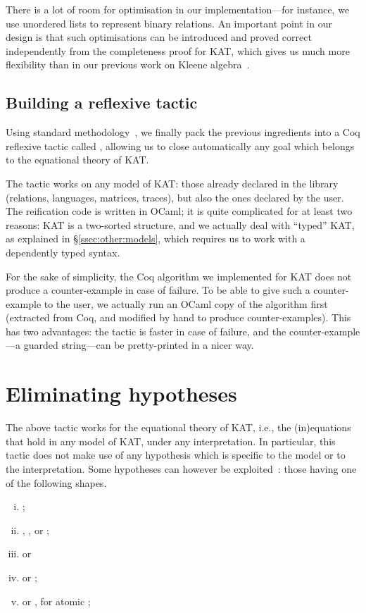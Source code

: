 \documentclass[a4paper]{llncs}
\begin{document}
There is a lot of room for optimisation in our implementation---for
instance, we use unordered lists to represent binary relations. An
important point in our design is that such optimisations can be
introduced and proved correct independently from the completeness
proof for KAT, which gives us much more flexibility than in our
previous work on Kleene algebra~\cite{bp:itp10:kacoq}.

\subsection{Building a reflexive tactic}
\label{ssec:kat:tac}

Using standard
methodology~\cite{BoyerMoore81,AllenCHA90,GregoireM05}, we finally pack the previous ingredients into a Coq reflexive tactic
called , allowing us to close automatically any goal which
belongs to the equational theory of KAT.

The tactic works on any model of KAT: those already declared in the
library (relations, languages, matrices, traces), but also the ones
declared by the user. 
The reification code is written in OCaml; it is quite complicated for
at least two reasons: KAT is a two-sorted structure, and we actually
deal with ``typed'' KAT, as explained in §\ref{ssec:other:models},
which requires us to work with a dependently typed syntax.

For the sake of simplicity, the Coq algorithm we implemented for KAT
does not produce a counter-example in case of failure. To be able to
give such a counter-example to the user, we actually run an OCaml
copy of the algorithm first (extracted from Coq, and modified by hand
to produce counter-examples). This has two advantages: the tactic is
faster in case of failure, and the counter-example---a guarded
string---can be pretty-printed in a nicer way.

\section{Eliminating hypotheses}
\label{sec:helim}

The above  tactic works for the equational theory of KAT,
i.e., the (in)equations that hold in any model of KAT, under any
interpretation.  In particular, this tactic does not make use of any
hypothesis which is specific to the model or to the interpretation.
Some hypotheses can however be
exploited~\cite{cohen94:ka:hypotheses,hardink02:kat:hypotheses}: those
having one of the following shapes.
\begin{enumerate}[(i)]
\item\label{sh:hoare} ;
\item\label{sh:appb} , , or ;
\item\label{sh:ppb}  or 
\item\label{sh:ab}  or ;
\item\label{sh:cpc}  or , for atomic  ;
\end{enumerate}
\end{document}
